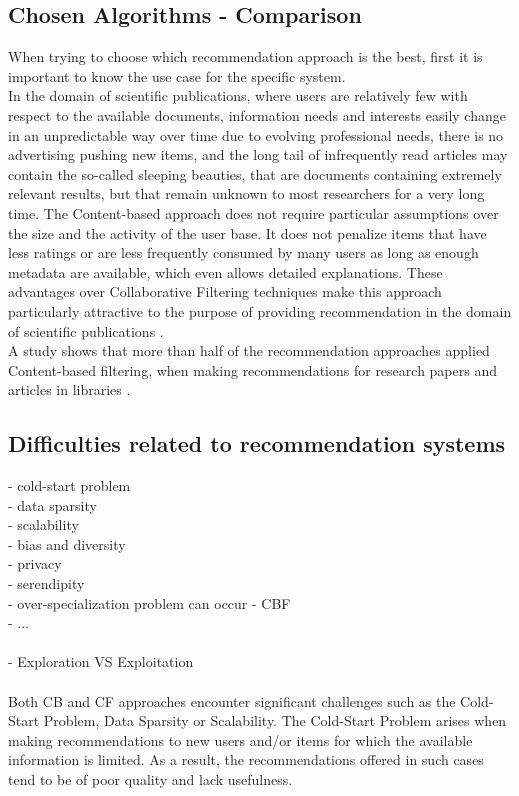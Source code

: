 \documentclass[10pt,oneside,english,a4paper]{article}
\begin{document}
\subsection{Chosen Algorithms - Comparison}
When trying to choose which recommendation approach is the best, first it is important to know the use case for the specific system. \\
%
In the domain of scientific publications, where users are relatively few with respect to the available documents, information needs and interests easily change in an unpredictable way over time due to evolving professional needs, there is no advertising pushing new items, and the long tail of infrequently read articles may contain the so-called sleeping beauties, that are documents containing extremely relevant results, but that remain unknown to most researchers for a very long time. The Content-based approach does not require particular assumptions over the size and the activity of the user base. It does not penalize items that have less ratings or are less frequently consumed by many users as long as enough metadata are available, which even allows detailed explanations. These advantages over Collaborative Filtering techniques make this approach particularly attractive to the purpose of providing recommendation in the domain of scientific publications \cite{De_Nart201484}. \\
%
A study shows that more than half of the recommendation approaches applied Content-based filtering, when making recommendations for research papers and articles in libraries \cite{Beel2016305}. \\
%

\clearpage
\subsection{Difficulties related to recommendation systems}
- cold-start problem\\
- data sparsity\\
- scalability\\
- bias and diversity\\
- privacy\\
- serendipity\\
- over-specialization problem can occur - CBF\\
- ...\\\\
- Exploration VS Exploitation\\\\
Both CB and CF approaches encounter significant challenges such as the Cold-Start Problem, Data Sparsity or Scalability. The Cold-Start Problem arises when making recommendations to new users and/or items for which the available information is limited. As a result, the recommendations offered in such cases tend to be of poor quality and lack usefulness.\cite{Al-Hassan2024a}\\\\
\end{document}

